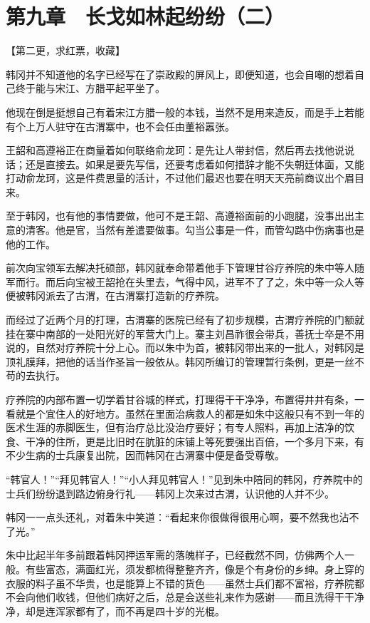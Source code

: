 \section{第九章　长戈如林起纷纷（二）}

【第二更，求红票，收藏】

韩冈并不知道他的名字已经写在了崇政殿的屏风上，即便知道，也会自嘲的想着自己终于能与宋江、方腊平起平坐了。

他现在倒是挺想自己有着宋江方腊一般的本钱，当然不是用来造反，而是手上若能有个上万人驻守在古渭寨中，也不会任由董裕嚣张。

王韶和高遵裕正在商量着如何联络俞龙珂：是先让人带封信，然后再去找他说说话；还是直接去。如果是要先写信，还要考虑着如何措辞才能不失朝廷体面，又能打动俞龙珂，这是件费思量的活计，不过他们最迟也要在明天天亮前商议出个眉目来。

至于韩冈，也有他的事情要做，他可不是王韶、高遵裕面前的小跑腿，没事出出主意的清客。他是官，当然有差遣要做事。勾当公事是一件，而管勾路中伤病事也是他的工作。

前次向宝领军去解决托硕部，韩冈就奉命带着他手下管理甘谷疗养院的朱中等人随军而行。而后向宝被王韶抢在头里去，气得中风，进军不了了之，朱中等一众人等便被韩冈派去了古渭，在古渭寨打造新的疗养院。

而经过了近两个月的打理，古渭寨的医院已经有了初步规模，古渭疗养院的门额就挂在寨中南部的一处阳光好的军营大门上。寨主刘昌祚很会带兵，善抚士卒是不用说的，自然对疗养院十分上心。而以朱中为首，被韩冈带出来的一批人，对韩冈是顶礼膜拜，把他的话当作圣旨一般依从。韩冈所编订的管理暂行条例，更是一丝不苟的去执行。

疗养院的内部布置一切学着甘谷城的样式，打理得干干净净，布置得井井有条，一看就是个宜住人的好地方。虽然在里面治病救人的都是如朱中这般只有不到一年的医术生涯的赤脚医生，但有治疗总比没治疗要好；有专人照料，再加上洁净的饮食、干净的住所，更是比旧时在肮脏的床铺上等死要强出百倍，一个多月下来，有不少生病的士兵康复出院，因而韩冈在古渭寨中便是备受尊敬。

“韩官人！”“拜见韩官人！”“小人拜见韩官人！”见到朱中陪同的韩冈，疗养院中的士兵们纷纷退到路边俯身行礼——韩冈上次来过古渭，认识他的人并不少。

韩冈一一点头还礼，对着朱中笑道：“看起来你很做得很用心啊，要不然我也沾不了光。”

朱中比起半年多前跟着韩冈押运军需的落魄样子，已经截然不同，仿佛两个人一般。有些富态，满面红光，须发都梳得整整齐齐，像是个有身份的乡绅。身上穿的衣服的料子虽不华贵，也是能算上不错的货色——虽然士兵们都不富裕，疗养院都不会向他们收钱，但他们病好之后，总是会送些礼来作为感谢——而且洗得干干净净，却是连浑家都有了，而不再是四十岁的光棍。

